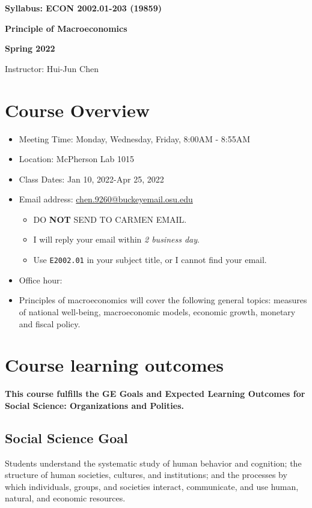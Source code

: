 \documentclass[12pt]{article}
\begin{document}
\centerline{\huge\bf Syllabus: ECON 2002.01-203 (19859)}
\medskip
\centerline{\LARGE \bf Principle of Macroeconomics}
\medskip
\centerline{\LARGE \bf Spring 2022}
\medskip
\centerline{\Large Instructor: Hui-Jun Chen}

\medskip

\section*{Course Overview}
\begin{itemize}
    \item Meeting Time: Monday, Wednesday, Friday, 8:00AM - 8:55AM
    \item Location: McPherson Lab 1015
    \item Class Dates: Jan 10, 2022-Apr 25, 2022
    \item Email address: \href{chen.9260@buckeyemail.osu.edu}{chen.9260@buckeyemail.osu.edu}
    \begin{itemize}
        \item DO \textbf{NOT} SEND TO CARMEN EMAIL.
        \item I will reply your email within \textit{2 business day}.
        \item Use \texttt{E2002.01} in your subject title, or I cannot find your email.
    \end{itemize}
    \item Office hour:
    \item Principles of macroeconomics will cover the following general topics: measures of national well-being, macroeconomic models, economic growth, monetary and fiscal policy.
\end{itemize}

\section*{Course learning outcomes}

\textbf{This course fulfills the GE Goals and Expected Learning Outcomes for Social Science: Organizations and Polities.}

\subsection*{Social Science Goal}

Students understand the systematic study of human behavior and cognition; the structure of human societies, cultures, and institutions; and the processes by which individuals, groups, and societies interact, communicate, and use human, natural, and economic resources.
\end{document}
